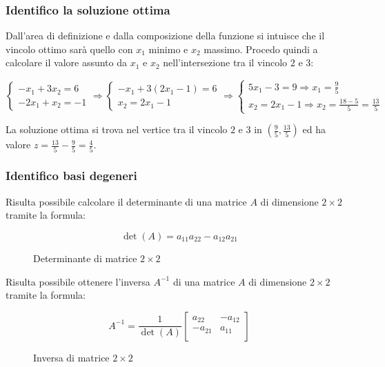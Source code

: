 \documentclass[\main/main.tex]{subfiles}
\begin{document}
\subsubsection*{Identifico la soluzione ottima}
Dall'area di definizione e dalla composizione della funzione si intuisce che il vincolo ottimo sarà quello con $x_1$ minimo e $x_2$ massimo. Procedo quindi a calcolare il valore assunto da $x_1$ e $x_2$ nell'intersezione tra il vincolo $2$ e $3$:

\[
  \begin{cases}
    -x_1 + 3x_2  = 6 \\
    -2x_1 + x_2  = -1
  \end{cases}
  \Rightarrow
  \begin{cases}
    -x_1 + 3(2x_1 -1)  = 6 \\
    x_2  =2x_1 -1
  \end{cases}
  \Rightarrow
  \begin{cases}
    5x_1 -3  = 9 \Rightarrow x_1 = \frac{9}{5} \\
    x_2  =2x_1 -1 \Rightarrow x_2 = \frac{18-5}{5} = \frac{13}{5}
  \end{cases}
\]

La soluzione ottima si trova nel vertice tra il vincolo $2$ e $3$ in $(\frac{9}{5}, \frac{13}{5})$ ed ha valore $z = \frac{13}{5} - \frac{9}{5} = \frac{4}{5}$.

\subsubsection*{Identifico basi degeneri}
\begin{definition}
  Risulta possibile calcolare il determinante di una matrice $A$ di dimensione $2 \times 2$ tramite la formula:
  \begin{figure}
    \[
      \det(A) = a_{11}a_{22} - a_{12}a_{21}
    \]
    \caption{Determinante di matrice $2 \times 2$}
  \end{figure}
\end{definition}

\begin{definition}
  Risulta possibile ottenere l'inversa $A^{-1}$ di una matrice $A$ di dimensione $2 \times 2$ tramite la formula:
  \begin{figure}
    \[
      A^{-1} = \frac{1}{\det(A)} \begin{bmatrix}
        a_{22}  & -a_{12} \\
        -a_{21} & a_{11}  \\
      \end{bmatrix}
    \]
    \caption{Inversa di matrice $2 \times 2$}
  \end{figure}
\end{definition}
\end{document}
